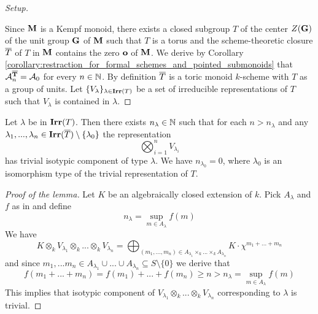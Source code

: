\begin{proof}[Setup]
\begin{enumerate}[label=\textbf{(\arabic*)}, leftmargin=3.0em]
\end{enumerate}
Since $\mathbf{M}$ is a Kempf monoid, there exists a closed subgroup $T$ of the center $Z(\mathbf{G})$ of the unit group $\mathbf{G}$ of $\mathbf{M}$ such that $T$ is a torus and the scheme-theoretic closure $\overline{T}$ of $T$ in $\mathbf{M}$ contains the zero $\mathbf{o}$ of $\mathbf{M}$. We derive by Corollary \ref{corollary:restraction_for_formal_schemes_and_pointed_submonoids} that ${\mathcal A}_n^{\mathbf{\overline{T}}} = {\mathcal A}_0$ for every $n\in {\mathbb N}$. By definition $\overline{T}$ is a toric monoid $k$-scheme with $T$ as a group of units. Let $\{V_{\lambda}\}_{\lambda\in \mathbf{Irr}(T)}$ be a set of irreducible representations of $T$ such that $V_{\lambda}$ is contained in $\lambda$.
\end{proof}

\begin{lemma}\label{lemma:stablization_for_representations}
Let $\lambda$ be in $\mathbf{Irr}(T)$. Then there exists $n_{\lambda}\in {\mathbb N}$ such that for each $n > n_{\lambda}$ and any $\lambda_1,...,\lambda_n\in \mathbf{Irr}(\overline{T})\setminus \{\lambda_0\}$ the representation
$$\bigotimes_{i=1}^nV_{\lambda_i}$$ 
has trivial isotypic component of type $\lambda$. We have $n_{\lambda_0} = 0$, where $\lambda_0$ is an isomorphism type of the trivial representation of $T$.
\end{lemma}
\begin{proof}[Proof of the lemma]
Let $K$ be an algebraically closed extension of $k$. Pick $A_{\lambda}$ and $f$ as in {\cite[Theorem 2.3]{Algebraic_monoids}} and define
$$n_{\lambda} = \sup_{m\in A_{\lambda}}f(m)$$
We have
$$K\otimes_kV_{\lambda_1}\otimes_k...\otimes_kV_{\lambda_n} = \bigoplus_{(m_1,...,m_n)\in A_{\lambda_1}\times_k ...\times_k A_{\lambda_n}}K\cdot \chi^{m_1+...+m_n}$$
and since $m_1,...m_n\in A_{\lambda_1}\cup ...\cup A_{\lambda_n}\subseteq S\setminus \{0\}$ we derive that
$$f(m_1+...+m_n) = f(m_1) + ... + f(m_n) \geq n > n_{\lambda} = \sup_{m\in A_{\lambda}}f(m)$$
This implies that isotypic component of $V_{\lambda_1}\otimes_k...\otimes_kV_{\lambda_n}$ corresponding to $\lambda$ is trivial.
\end{proof}

